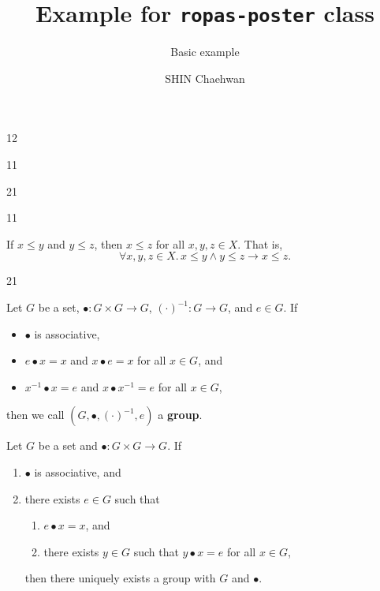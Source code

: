 \documentclass{ropas-poster}
\title{Example for \texttt{ropas-poster} class}
\subtitle{Basic example}
\author{SHIN Chaehwan}
\institute{Programming Research Laboratory (ROPAS), Seoul National University}
\begin{document}
  \begin{postergrid}{1}{2}
    \begin{posterblock*}{1}{1}
      \begin{postergrid}{2}{1}
        \begin{posterblock}{1}{1}

          If \(x\leq y\) and \(y\leq z\), then \(x\leq z\) for all \(x,y,z\in X\).
          That is, \[\forall x,y,z\in X.\,x\leq y\mathrel{\land}y\leq z\rightarrow x\leq z.\]
        \end{posterblock}

        \begin{posterblock}{2}{1}

          Let \(G\) be a set, \({\bullet}:G\times G\mathbin{\rightarrow}G\), \((\cdot)^{-1}:G\mathbin{\rightarrow}G\), and \(e\in G\).
          If \begin{itemize}
            \item
            \(\bullet\) is associative,
            \item
            \(e\bullet x=x\) and \(x\bullet e=x\) for all \(x\in G\), and
            \item
            \(x^{-1}\bullet x=e\) and \(x\bullet x^{-1}=e\) for all \(x\in G\),
          \end{itemize} then we call \(\left(G,{\bullet},(\cdot)^{-1},e\right)\) a \textbf{group}.

          Let \(G\) be a set and \({\bullet}:G\times G\mathbin{\rightarrow}G\).
          If \begin{enumerate}
            \item
            \(\bullet\) is associative, and
            \item
            there exists \(e\in G\) such that \begin{enumerate}
              \item
              \(e\bullet x=x\), and
              \item
              there exists \(y\in G\) such that \(y\bullet x=e\) for all \(x\in G\),
            \end{enumerate} then there uniquely exists a group with \(G\) and \(\bullet\).
          \end{enumerate}
        \end{posterblock}
      \end{postergrid}
    \end{posterblock*}


\end{postergrid}
\end{document}
